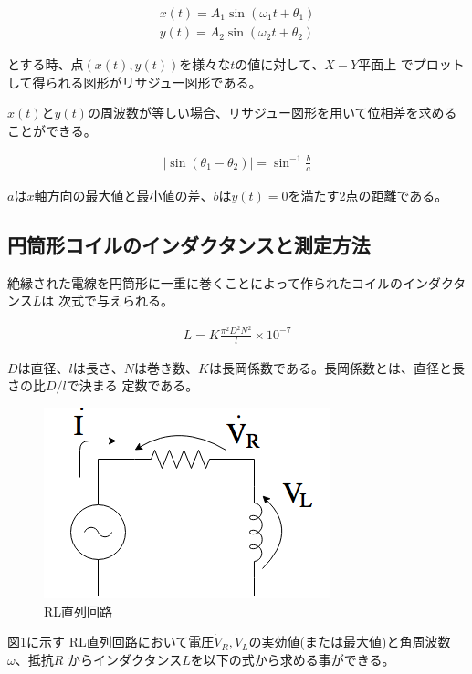 \documentclass[dvipdfmx]{jsarticle}
\begin{document}
\begin{eqnarray}
  x(t) = A_1\sin(\omega_1 t + \theta_1) \\
	y(t) = A_2\sin(\omega_2 t + \theta_2) 
\end{eqnarray}

とする時、点$(x(t), y(t))を様々なtの値に対して、X-Y平面上$
でプロットして得られる図形がリサジュー図形である。

$x(t)とy(t)$の周波数が等しい場合、リサジュー図形を用いて位相差を求めることができる。

\begin{eqnarray}
  |\sin(\theta_1 - \theta_2)| = \sin^{-1} \frac{b}{a}
\end{eqnarray}

$a$は$x軸方向$の最大値と最小値の差、$b$は$y(t) = 0$を満たす2点の距離である。

\subsection{円筒形コイルのインダクタンスと測定方法}
絶縁された電線を円筒形に一重に巻くことによって作られたコイルのインダクタンス$L$は
次式で与えられる。

\begin{eqnarray}
  L = K \frac{\pi^2 D^2 N^2}{l} \times 10^{-7}
\end{eqnarray}

$Dは直径、lは長さ、Nは巻き数、Kは長岡係数である。$長岡係数とは、直径と長さの比$D/l$で決まる
定数である。

\begin{figure}[h]
  \centering
  \includegraphics[scale=0.4]{RL_Series_Circut.png}
  \caption{RL直列回路}
  \label{fig:RL_Series_Circuit}
\end{figure}

図\ref{fig:RL_Series_Circuit}に示す
RL直列回路において電圧$\dot V_R, \dot V_L$の実効値(または最大値)と角周波数$\omega、抵抗R$
からインダクタンス$L$を以下の式から求める事ができる。
\end{document}
